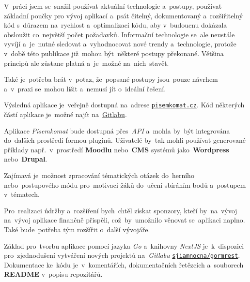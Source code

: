\documentclass[11pt,a4paper]{report}
\begin{document}
        V~práci jsem se~snažil používat aktuální technologie a~postupy, používat základní poučky pro vývoj aplikací a~psát čitelný, dokumentovaný a~rozšiřitelný kód s~důrazem na~rychlost a~optimalizaci kódu, aby v~budoucnu dokázala obsloužit co~největší počet požadavků. Informační technologie se~ale neustále vyvíjí a~je~nutné sledovat a~vyhodnocovat nové trendy a~technologie, protože v~době této publikace již~mohou být~některé postupy překonané. Většina principů ale zůstane platná a~je~možné na~nich~stavět.
        
        Také je~potřeba brát v~potaz, že~popsané postupy jsou~pouze návrhem a~v~praxi se~mohou lišit a~nemusí jít o~ideální řešení.
        
        Výsledná aplikace je~veřejně dostupná na~adrese \href{https://pisemkomat.cz}{\texttt{pisemkomat.cz}}. Kód některých částí aplikace je~možné najít na~\href{https://gitlab.com/pisemkomat}{Gitlabu}.
        
        Aplikace \emph{Písemkomat} bude dostupná přes~\emph{API} a~mohla by~být integrována do~dalších prostředí formou pluginů. Uživatelé by~tak mohli používat generované příklady např.~v~prostředí \textbf{Moodlu} nebo~\textbf{CMS} systémů jako~\textbf{Wordpress} nebo~\textbf{Drupal}.
    
        Zajímavá je~možnost zpracování tématických otázek do~herního nebo~postupového módu pro~motivaci žáků do~učení sbíráním bodů a~postupem v~tématech.
        
        Pro~realizaci údržby a~rozšíření bych~chtěl získat sponzory, kteří by~na~vývoj na~vývoj aplikace finančně přispěli, což~by~umožnilo věnovat se~aplikaci naplno. Také bude~potřeba tým rozšířit o~další vývojáře.
            
        Základ pro~tvorbu aplikace pomocí jazyka \emph{Go} a~knihovny \emph{NextJS} je~k~dispozici pro~zjednodušení vytváření nových projektů na~\emph{Gitlabu} \href{https://gitlab.com/sjiamnocna/gormrest}{\texttt{sjiamnocna/gormrest}}. Dokumentace ke~kódu je~v~komentářích, dokumentačních řetězcích a~souborech \textbf{README} v~popisu repozitářů.

    \newpage
    \printbibliography
\end{document}
